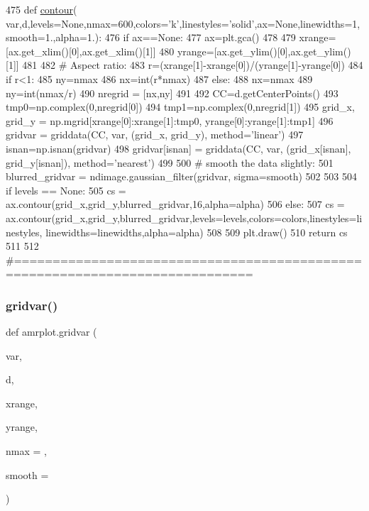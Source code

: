 \begin{DoxyCode}
475 \textcolor{keyword}{def }\hyperlink{namespaceamrplot_a6c85688725768d179b09bc02dffca0f3}{contour}(
      var,d,levels=None,nmax=600,colors='k',linestyles='solid',ax=None,linewidths=1,smooth=1.,alpha=1.):
476     \textcolor{keywordflow}{if} ax==\textcolor{keywordtype}{None}:
477         ax=plt.gca()
478 
479     xrange=[ax.get\_xlim()[0],ax.get\_xlim()[1]]
480     yrange=[ax.get\_ylim()[0],ax.get\_ylim()[1]]
481 
482     \textcolor{comment}{# Aspect ratio:}
483     r=(xrange[1]-xrange[0])/(yrange[1]-yrange[0])
484     \textcolor{keywordflow}{if} r<1:
485         ny=nmax
486         nx=int(r*nmax)
487     \textcolor{keywordflow}{else}:
488         nx=nmax
489         ny=int(nmax/r)
490     nregrid = [nx,ny]
491     
492     CC=d.getCenterPoints()
493     tmp0=np.complex(0,nregrid[0])
494     tmp1=np.complex(0,nregrid[1])
495     grid\_x, grid\_y = np.mgrid[xrange[0]:xrange[1]:tmp0, yrange[0]:yrange[1]:tmp1]
496     gridvar = griddata(CC, var, (grid\_x, grid\_y), method=\textcolor{stringliteral}{'linear'})
497     isnan=np.isnan(gridvar)
498     gridvar[isnan] = griddata(CC, var, (grid\_x[isnan], grid\_y[isnan]), method=\textcolor{stringliteral}{'nearest'})
499 
500 \textcolor{comment}{# smooth the data slightly:}
501     blurred\_gridvar = ndimage.gaussian\_filter(gridvar, sigma=smooth)
502 
503 
504     \textcolor{keywordflow}{if} levels == \textcolor{keywordtype}{None}:
505         cs = ax.contour(grid\_x,grid\_y,blurred\_gridvar,16,alpha=alpha)
506     \textcolor{keywordflow}{else}:
507         cs = ax.contour(grid\_x,grid\_y,blurred\_gridvar,levels=levels,colors=colors,linestyles=linestyles,
      linewidths=linewidths,alpha=alpha)
508 
509     plt.draw()
510     \textcolor{keywordflow}{return} cs
511 
512 \textcolor{comment}{#=============================================================================}
\end{DoxyCode}
\mbox{\label{namespaceamrplot_aa8e7367464df74565e4c8ab85660def0}} 
\subsubsection{\texorpdfstring{gridvar()}{gridvar()}}
{\footnotesize\ttfamily def amrplot.\+gridvar (\begin{DoxyParamCaption}\item[{}]{var,  }\item[{}]{d,  }\item[{}]{xrange,  }\item[{}]{yrange,  }\item[{}]{nmax = {},  }\item[{}]{smooth = {} }\end{DoxyParamCaption})}



